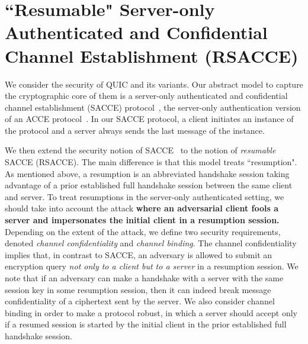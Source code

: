\section{``Resumable" Server-only Authenticated and Confidential Channel Establishment (RSACCE)} \label{sec:rsacce}

We consider the security of QUIC and its variants.
Our abstract model to capture the cryptographic core of them is a server-only
authenticated and confidential channel establishment (SACCE) protocol~\cite{KPW13:SACCE},
the server-only authentication version of an ACCE protocol~\cite{JKSS12:ACCE}.
In our SACCE protocol, a client initiates an instance of the protocol and
a server always sends the last message of the instance.

We then extend the security notion of SACCE~\cite{KPW13:SACCE}
to the notion of \textit{resumable} SACCE (RSACCE).
The main difference is that this model treats ``resumption".
As mentioned above, a resumption is an abbreviated handshake session
taking advantage of a prior established full handshake session
between the same client and server.
To treat resumptions in the server-only authenticated setting,
we should take into account the attack \textbf{where an adversarial client fools a server
and impersonates the initial client in a resumption session.}
Depending on the extent of the attack, we define two security requirements,
denoted \textit{channel confidentiality} and \textit{channel binding}.
The channel confidentiality implies that, in contrast to SACCE,
an adversary is allowed to submit
an encryption query \textit{not only to a client but to a server} in a resumption session.
We note that if an adversary can make a handshake with a server with the same session
key in some resumption session, then it can indeed break message confidentiality of
a ciphertext sent by the server.
We also consider channel binding in order to make a protocol robust,
in which a server should accept
only if a resumed session is started by the initial client
in the prior established full handshake session.



